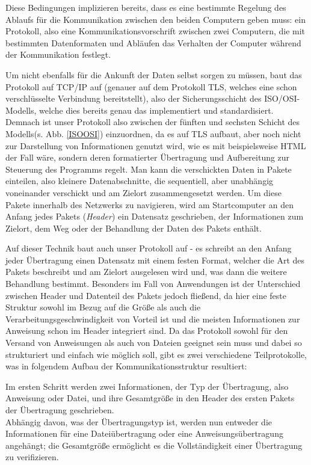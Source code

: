 Diese Bedingungen implizieren bereits, dass es eine bestimmte Regelung des Ablaufs für die Kommunikation zwischen den beiden Computern geben muss: ein Protokoll, also eine Kommunikationsvorschrift zwischen zwei Computern, die mit bestimmten Datenformaten und Abläufen das Verhalten der Computer während der Kommunikation festlegt.\par
Um nicht ebenfalls für die Ankunft der Daten selbst sorgen zu müssen, baut das Protokoll auf TCP/IP auf (genauer auf dem Protokoll TLS, welches eine schon verschlüsselte Verbindung bereitstellt), also der Sicherungsschicht des ISO/OSI-Modells, welche dies bereits genau das implementiert und standardisiert. Demnach ist unser Protokoll also zwischen der fünften und sechsten Schicht des Modells(s. Abb. \ref{ISOOSI}) einzuordnen, da es auf TLS aufbaut, aber noch nicht zur Darstellung von Informationen genutzt wird, wie es mit beispielsweise HTML der Fall wäre, sondern deren formatierter Übertragung und Aufbereitung zur Steuerung des Programms regelt.
Man kann die verschickten Daten in Pakete einteilen, also kleinere Datenabschnitte, die sequentiell, aber unabhängig voneinander verschickt und am Zielort zusammengesetzt werden.
Um diese Pakete innerhalb des Netzwerks zu navigieren, wird am Startcomputer an den Anfang jedes Pakets (\textit{Header}) ein Datensatz geschrieben, der Informationen zum Zielort, dem Weg oder der Behandlung der Daten des Pakets enthält.\par 
Auf dieser Technik baut auch unser Protokoll auf - es schreibt an den Anfang jeder Übertragung einen Datensatz mit einem festen Format, welcher die Art des Pakets beschreibt und am Zielort ausgelesen wird und, was dann die weitere Behandlung bestimmt.
Besonders im Fall von Anwendungen ist der Unterschied zwischen Header und Datenteil des Pakets jedoch fließend, da hier eine feste Struktur sowohl im Bezug auf die Größe als auch die Verarbeitungsgeschwindigkeit von Vorteil ist und die meisten Informationen zur Anweisung schon im Header integriert sind.
Da das Protokoll sowohl für den Versand von Anweisungen als auch von Dateien geeignet sein muss und dabei so strukturiert und einfach wie möglich soll, gibt es zwei verschiedene Teilprotokolle, was in folgendem Aufbau der Kommunikationsstruktur resultiert:\par
Im ersten Schritt werden zwei Informationen, der Typ der Übertragung, also Anweisung oder Datei, und ihre Gesamtgröße in den Header des ersten Pakets der Übertragung geschrieben.\\
Abhängig davon, was der Übertragungstyp ist, werden nun entweder die Informationen für eine Dateiübertragung oder eine Anweisungsübertragung angehängt; die Gesamtgröße ermöglicht es die Vollständigkeit einer Übertragung zu verifizieren.

